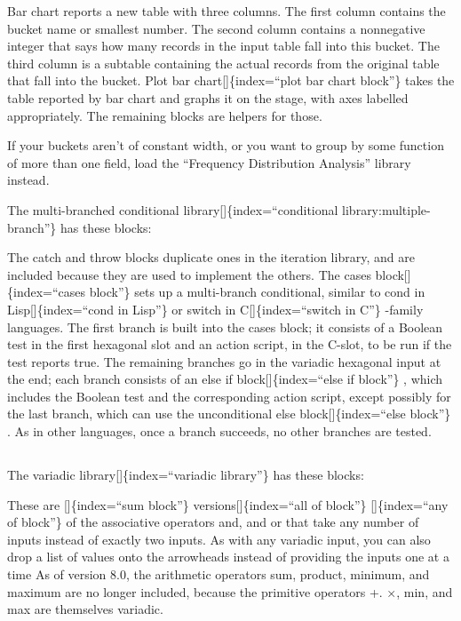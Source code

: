 \documentclass[
  letterpaper,
]{book}
\begin{document}
Bar chart reports a new table with three columns. The first column
contains the bucket name or smallest number. The second column contains
a nonnegative integer that says how many records in the input table fall
into this bucket. The third column is a subtable containing the actual
records from the original table that fall into the bucket. Plot bar
chart{[}{]}\{index=``plot bar chart block''\} takes the table reported
by bar chart and graphs it on the stage, with axes labelled
appropriately. The remaining blocks are helpers for those.

If your buckets aren't of constant width, or you want to group by some
function of more than one field, load the ``Frequency Distribution
Analysis'' library instead.

The multi-branched conditional library{[}{]}\{index=``conditional
library:multiple-branch''\} has these blocks:

The catch and throw blocks duplicate ones in the iteration library, and
are included because they are used to implement the others. The cases
block{[}{]}\{index=``cases block''\} sets up a multi-branch conditional,
similar to cond in Lisp{[}{]}\{index=``cond in Lisp''\} or switch in
C{[}{]}\{index=``switch in C''\} -family languages. The first branch is
built into the cases block; it consists of a Boolean test in the first
hexagonal slot and an action script, in the C-slot, to be run if the
test reports true. The remaining branches go in the variadic hexagonal
input at the end; each branch consists of an else if
block{[}{]}\{index=``else if block''\} , which includes the Boolean test
and the corresponding action script, except possibly for the last
branch, which can use the unconditional else block{[}{]}\{index=``else
block''\} . As in other languages, once a branch succeeds, no other
branches are tested.

\subsection{}\label{section}

The variadic library{[}{]}\{index=``variadic library''\} has these
blocks:

These are {[}{]}\{index=``sum block''\} versions{[}{]}\{index=``all of
block''\} {[}{]}\{index=``any of block''\} of the associative operators
and, and or that take any number of inputs instead of exactly two
inputs. As with any variadic input, you can also drop a list of values
onto the arrowheads instead of providing the inputs one at a time As of
version 8.0, the arithmetic operators sum, product, minimum, and maximum
are no longer included, because the primitive operators +. ×, min, and
max are themselves variadic.
\end{document}
